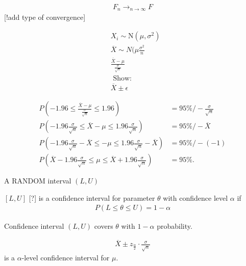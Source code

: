 \documentclass[10pt]{article}
\begin{document}
\begin{theorem} \label{thm:Glivenko-Conteli}
\begin{align*}
F_n \rightarrow _{n \to \infty } F
\end{align*}
[!add type of convergence]
\end{theorem}



\begin{align*}
 &  X_i \sim \text{N}(\mu , \sigma^2) \\
 &  \overline{X} \sim N(\mu  \frac{\sigma ^2 }{n} \\
 &  \frac{\overline{X} -  \mu }{\frac{\sigma}{\sqrt{n}}} \\
 &  \text{ Show: } \\
 &  \overline{X} \pm \epsilon 
\end{align*}

\begin{align*}
P( - 1.96 \leq \frac{\overline{X} - \mu }{\frac{\sigma }{\sqrt{n}}} \leq 1.96)  &  =  95 \%  / -  \frac{\sigma}{\sqrt{n}} \\
P( - 1.96  \frac{\sigma }{\sqrt{n}}\leq \overline{X} - \mu \leq 1.96 \frac{\sigma }{\sqrt{n}})  &  =  95 \%  / -  \overline{X} \\
P( - 1.96  \frac{\sigma }{\sqrt{n}} - \overline{X} \leq - \mu \leq 1.96 \frac{\sigma }{\sqrt{n}} - \overline{X})  &  =  95 \%  / -  ( - 1) \\
P( \overline{X} - 1.96  \frac{\sigma }{\sqrt{n}}  \leq  \mu \leq \overline{X} + 1.96 \frac{\sigma }{\sqrt{n}})  &  =  95 \%.
\end{align*}
\begin{definition}  \label{def:Confidence_Interval}
A RANDOM interval \((L,U)\)

\([L,U]\)
[?]
is a confidence interval for parameter \(\theta\) with confidence level \(\alpha\) if
\begin{align*}
P(L \leq \theta \leq U) =  1 - \alpha
\end{align*}

Confidence interval \((L,U)\) covers \(\theta\) with \(1 - \alpha\) probability.
\end{definition}


\begin{align*}
\overline{X} \pm z  _{\frac{\alpha}{2}} \cdot \frac{\sigma }{\sqrt{n}}
\end{align*}
is a \(\alpha\)-level confidence interval for \(\mu\).
\end{document}
